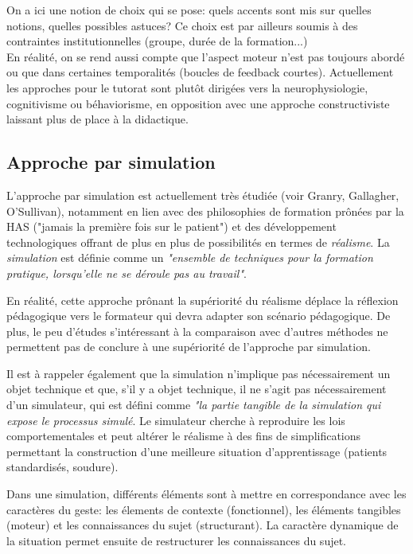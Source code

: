 \documentclass{article}
\begin{document}
On a ici une notion de choix qui se pose: quels accents sont mis sur 
quelles notions, quelles possibles astuces? \cite{petit_apprendre_2017}
Ce choix est par ailleurs soumis à des contraintes institutionnelles 
(groupe, durée de la formation...)
\\

En réalité, on se rend aussi compte que l'aspect moteur n'est pas toujours 
abordé ou que dans certaines temporalités (boucles de feedback courtes).
Actuellement les approches pour le tutorat sont plutôt dirigées vers la 
neurophysiologie, cognitivisme ou béhaviorisme, en opposition avec une 
approche constructiviste laissant plus de place à la didactique.
\\

\subsection{Approche par simulation}

L'approche par simulation est actuellement très étudiée (voir Granry, 
Gallagher, O'Sullivan), notamment en lien avec des philosophies de 
formation prônées par la HAS ("jamais la première fois sur le patient") 
et des développement technologiques offrant de plus en plus de possibilités 
en termes de \emph{réalisme}. La \emph{simulation} est définie comme un 
\emph{"ensemble de techniques pour la formation pratique, lorsqu'elle ne 
se déroule pas au travail"}.

En réalité, cette approche prônant la supériorité du réalisme déplace la 
réflexion pédagogique vers le formateur qui devra adapter son scénario 
pédagogique. De plus, le peu d'études s'intéressant à la comparaison avec 
d'autres méthodes ne permettent pas de conclure à une supériorité de 
l'approche par simulation.

Il est à rappeler également que la simulation n'implique pas 
nécessairement un objet technique et que, s'il y a objet technique, il 
ne s'agit pas nécessairement d'un simulateur, qui est défini comme 
\emph{"la partie tangible de la simulation qui  expose le processus 
simulé}.
Le simulateur cherche à reproduire les lois comportementales et peut 
altérer le réalisme à des fins de simplifications permettant la 
construction d'une meilleure situation d'apprentissage (patients 
standardisés, soudure).

Dans une simulation, différents éléments sont à mettre en correspondance 
avec les caractères du geste: les élements de contexte (fonctionnel), 
les éléments tangibles (moteur) et les connaissances du sujet 
(structurant). La caractère dynamique de la situation permet ensuite de 
restructurer les connaissances du sujet.
\end{document}
